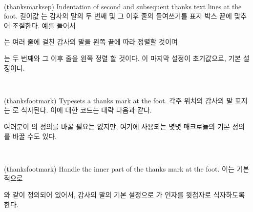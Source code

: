 \begin{syntax}
\lnc{\thanksmarksep} \\
\end{syntax}
\glossary(thanksmarksep)%
  {}%
  {Indentation of second and subsequent thanks text lines at the foot.}
길이값 \lnc{\thanksmarksep}는 감사의 말의 두 번째 및 그 이후 줄의 들여쓰기를
표지 박스 끝에 맞추어 조절한다.
예를 들어서
\begin{lcode}
\setlength{\thanksmarksep}{0em}
\end{lcode}
는 여러 줄에 걸친 감사의 말을 왼쪽 끝에 따라 정렬할 것이며
\begin{lcode}
\setlength{\thanksmarksep}{-\thanksmarkwidth}
\end{lcode}
는 두 번째와 그 이후 줄을 왼쪽 정렬 할 것이다.
이 마지막 설정이 초기값으로, 기본 설정이다.

\begin{syntax}
\cmd{\thanksfootmark} \\
\end{syntax}
\glossary(thanksfootmark)%
  {}%
  {Typesets a thanks mark at the foot.}
  각주 위치의 감사의 말 표지는 \cmd{\thanksfootmark}로
  식자된다.
  이에 대한 코드는 대략 다음과 같다.
\begin{lcode}
\newcommand{\thanksfootmark}{%
  \hbox to\thanksmarkwidth{\hfil\normalfont%
     \thanksscript{\thefootnote}}}
\end{lcode}
여러분이 \cmd{\thanksfootmark}의 정의를 바꿀 필요는 없지만, 여기에 사용되는
몇몇 매크로들의 기본 정의를 바꿀 수도 있다.

\begin{syntax}
\cmd{\thanksscript} \\
\end{syntax}
\glossary(thanksfootmark)%
  {}%
  {Handle the inner part of the thanks mark at the foot.}
이는 기본적으로
\begin{lcode}
\newcommand{\thanksscript}[1]{\textsuperscript{#1}}
\end{lcode}
와 같이 정의되어 있어서, 감사의 말의 기본 설정으로 \cmd{\thanksscript}가 인자를
윗첨자로 식자하도록 한다.



